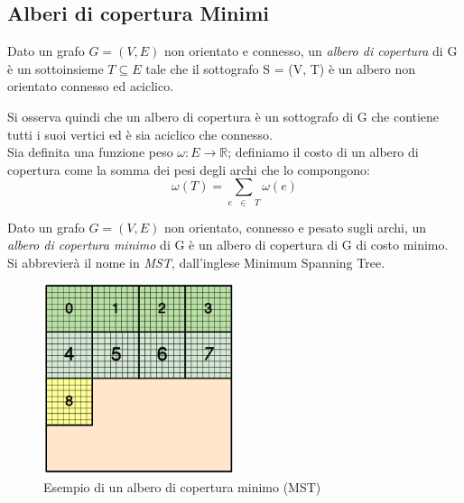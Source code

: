 \subsection{Alberi di copertura Minimi}\label{subsec:mst_description}
\begin{defn}
Dato un grafo $G = (V, E)$ non orientato e connesso, un \emph{albero di copertura} di G è un sottoinsieme $T \subseteq E$ tale che il sottografo S = (V, T) è un albero non orientato connesso ed aciclico.
\end{defn}
Si osserva quindi che un albero di copertura è un sottografo di G che contiene tutti i suoi vertici ed è sia aciclico che connesso.\\
Sia definita una funzione peso $\omega: E \rightarrow \mathbb{R}$; definiamo il costo di un albero di copertura come la somma dei pesi degli archi che lo compongono:
\begin{equation}
\omega(T) = \sum_{e \text{ } \in \text{ } T} \omega(e)
\end{equation}
\begin{defn}
	Dato un grafo $G = (V, E)$ non orientato, connesso e pesato sugli archi, un \emph{albero di copertura minimo} di G è un albero di copertura di G di costo minimo. Si abbrevierà il nome in \emph{MST}, dall’inglese Minimum Spanning Tree.
\end{defn}
\begin{figure}[H]
	\centering
	\includegraphics[width=0.5\textwidth]{immagini/block_on_grid.png}
	\caption{Esempio di un albero di copertura minimo (MST)}
	\label{fig:mst_simple}
\end{figure}

